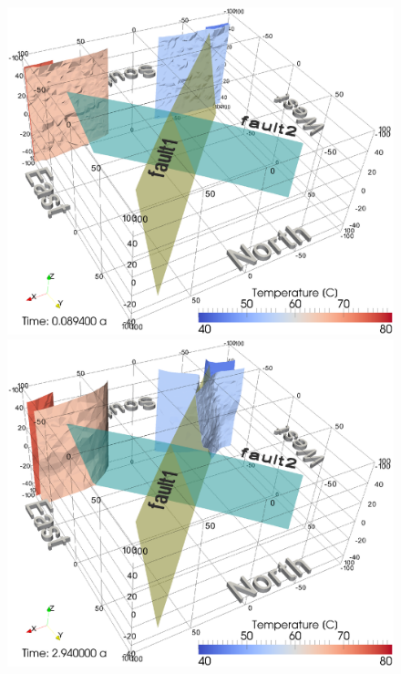 \begin{figure}[htbp]
    \begin{center}
        \begin{minipage}{0.35\textwidth}
            \includegraphics[width=1\textwidth]{T/figures/2u2f_fig5a.eps}
        \end{minipage}
        \begin{minipage}{0.35\textwidth}
            \includegraphics[width=1\textwidth]{T/figures/2u2f_fig5b.eps}
        \end{minipage}

\end{center}
\end{figure}
